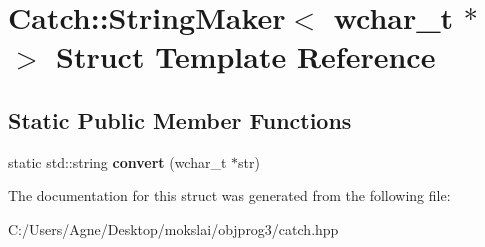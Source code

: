 \hypertarget{struct_catch_1_1_string_maker_3_01wchar__t_01_5_01_4}{}\section{Catch\+:\+:String\+Maker$<$ wchar\+\_\+t $\ast$ $>$ Struct Template Reference}
\label{struct_catch_1_1_string_maker_3_01wchar__t_01_5_01_4}
\subsection*{Static Public Member Functions}
\begin{DoxyCompactItemize}
\item 
\mbox{\label{struct_catch_1_1_string_maker_3_01wchar__t_01_5_01_4_a6112fe324da2a0b3a690071a228ecd71}} 
static std\+::string {\bfseries convert} (wchar\+\_\+t $\ast$str)
\end{DoxyCompactItemize}


The documentation for this struct was generated from the following file\+:\begin{DoxyCompactItemize}
\item 
C\+:/\+Users/\+Agne/\+Desktop/mokslai/objprog3/catch.\+hpp\end{DoxyCompactItemize}
